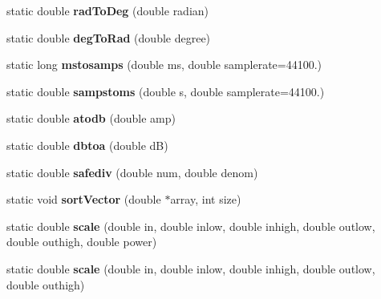 \begin{DoxyCompactItemize}
\item 
\hypertarget{class_tools_a269b79b2eb6b5580c6e80868556d8e85}{static double {\bfseries rad\-To\-Deg} (double radian)}\label{class_tools_a269b79b2eb6b5580c6e80868556d8e85}

\item 
\hypertarget{class_tools_aa54c52f0497e0197d086d463f7a87ef5}{static double {\bfseries deg\-To\-Rad} (double degree)}\label{class_tools_aa54c52f0497e0197d086d463f7a87ef5}

\item 
\hypertarget{class_tools_a21cbc1a838db932072ec93ebfd3879a2}{static long {\bfseries mstosamps} (double ms, double samplerate=44100.)}\label{class_tools_a21cbc1a838db932072ec93ebfd3879a2}

\item 
\hypertarget{class_tools_aede1af9b4db6b5c4b12eec63df370786}{static double {\bfseries sampstoms} (double s, double samplerate=44100.)}\label{class_tools_aede1af9b4db6b5c4b12eec63df370786}

\item 
\hypertarget{class_tools_abec543fe7c05d9f8c350ad0bc58e77fe}{static double {\bfseries atodb} (double amp)}\label{class_tools_abec543fe7c05d9f8c350ad0bc58e77fe}

\item 
\hypertarget{class_tools_aa4c15bcee52921e36788e5f37d9b4465}{static double {\bfseries dbtoa} (double d\-B)}\label{class_tools_aa4c15bcee52921e36788e5f37d9b4465}

\item 
\hypertarget{class_tools_ac4e2685f6a47384a65d88d8f2e1471c3}{static double {\bfseries safediv} (double num, double denom)}\label{class_tools_ac4e2685f6a47384a65d88d8f2e1471c3}

\item 
\hypertarget{class_tools_a56ce4d215b8249fd71638a11ea514244}{static void {\bfseries sort\-Vector} (double $\ast$array, int size)}\label{class_tools_a56ce4d215b8249fd71638a11ea514244}

\item 
\hypertarget{class_tools_a3c6a0c3bd67422b1914028da16bd4537}{static double {\bfseries scale} (double in, double inlow, double inhigh, double outlow, double outhigh, double power)}\label{class_tools_a3c6a0c3bd67422b1914028da16bd4537}

\item 
\hypertarget{class_tools_aa6dbdcc5f6113002f0a74857f93d7cea}{static double {\bfseries scale} (double in, double inlow, double inhigh, double outlow, double outhigh)}\label{class_tools_aa6dbdcc5f6113002f0a74857f93d7cea}


\end{DoxyCompactItemize}
